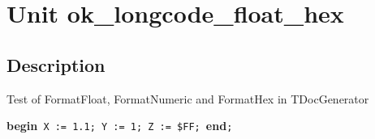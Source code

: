 \documentclass{report}
\begin{document}
\label{toc}\tableofcontents
\newpage
\newlength{\tmplength}
\chapter{Unit ok{\_}longcode{\_}float{\_}hex}
\label{ok_longcode_float_hex}
\section{Description}
Test of FormatFloat, FormatNumeric and FormatHex in TDocGenerator\hfill\vspace*{1ex}



\texttt{}\textbf{begin}\texttt{~X~:=~1.1;~Y~:=~1;~Z~:=~{\$}FF;~}\textbf{end}\texttt{;\\
}
\end{document}

